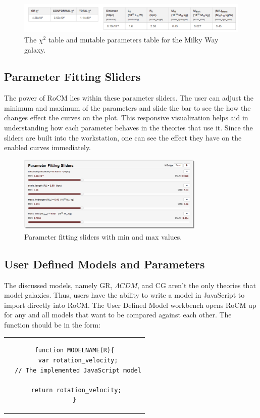 \documentclass[conference]{IEEEtran-modified}
\begin{document}
\begin{figure}[h!]
\centering
\includegraphics[width=\textwidth]{MILKY-WAY-CHI-PARAMS}
\caption{The $\chi^2$ table and mutable parameters table for the Milky Way galaxy.}
\label{param_table_fig}
\end{figure}

\subsection{Parameter Fitting Sliders}

The power of RoCM lies within these parameter sliders. The user can adjust the minimum and maximum of the parameters and slide the bar to see the how the changes effect the curves on the plot. This responsive visualization helps aid in understanding how each parameter behaves in the theories that use it.  Since the sliders are built into the workstation, one can see the effect they have on the enabled curves immediately.

\begin{figure}[h!]
\centering
\includegraphics[width=0.8\textwidth]{paramslider_long}
\caption{Parameter fitting sliders with min and max values.}
\label{slider_fig}
\end{figure}

\newpage

\subsection{User Defined Models and Parameters}
The discussed models, namely GR, $\Lambda CDM$, and CG aren't the only theories that model galaxies. Thus, users have the ability to write a model in JavaScript to import directly into RoCM. The User Defined Model workbench opens RoCM up for any and all models that want to be compared against each other. The function should be in the form:
\begin{center}
\begin{tabular}{c}
\begin{lstlisting}
function MODELNAME(R){
  var rotation_velocity;
  // The implemented JavaScript model
	
  return rotation_velocity; 
}
\end{lstlisting}
\end{tabular}
\end{center}
\end{document}
